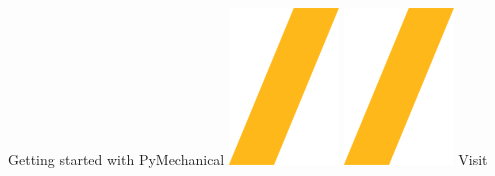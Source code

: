 \documentclass[9pt,landscape]{article}
\begin{document}
\vspace{-0.45cm}
\noindent\makebox[\linewidth]{\rule{\paperwidth}{3pt}}
\begin{center}
Getting started with PyMechanical \includegraphics[height=\fontcharht\font`\S]{slash.png} \href{https://github.com/ansys/pymechanical}{\color{blue}{PyMechanical on GitHub}}
\includegraphics[height=\fontcharht\font`\S]{slash.png} Visit 
\end{center}
\end{document}
